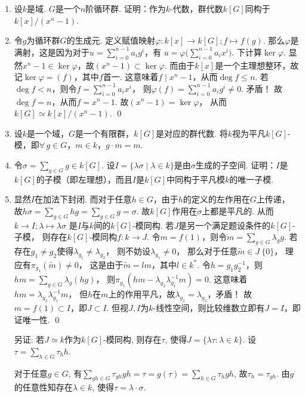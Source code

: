 \begin{enumerate}
\item[9.6] 设$k$是域. $G$是一个$n$阶循环群. 
    证明：作为$k$-代数，群代数$k[G]$同构于$k[x]/(x^{n}-1)$.
\item[\textbf{证明:}]
    令$g$为循环群$G$的生成元. 定义赋值映射$\varphi:k[x] \rightarrow k[G];f \mapsto f(g)$.
    那么$\varphi$是满射，这是因为对于$u=\sum\limits_{i=0}^{n-1}a_{i}g^{i}$，有
    $u = \varphi\big(\sum\limits_{i=0}^{n-1}a_{i}x^{i}\big)$.
    下计算$\ker \varphi$.
    显然$x^{n}-1 \in \ker \varphi$，故$(x^{n}-1) \subset \ker \varphi$.
    而由于$k[x]$是一个主理想整环，故记$\ker \varphi = (f)$，其中$f$首一.
    这意味着$f \mid x^{n}-1$，从而$\deg f \leq n$.
    若$\deg f < n$，则令$f = \sum\limits_{i=0}^{n-1}a_{i}x^{i}$，
    则$\varphi(f) = \sum\limits_{i=0}^{n-1}a_{i}g^{i} \neq 0$. 矛盾！
    故$\deg f = n$，从而$f = x^{n} - 1$.
    故$(x^{n}-1) = \ker \varphi$，
    从而$k[G] \simeq k[x]/(x^{n}-1)$. \qed

\item[9.7] 设$k$是一个域，$G$是一个有限群，$k[G]$是对应的群代数. 
    将$k$视为平凡$k[G]$-模，即$\forall \, g \in G$，$m \in k$，$g\cdot m=m$.
\item[(i)] 令$\sigma=\sum\limits_{g \in G}g \in k[G]$. 
    设$I = \{\lambda\sigma \mid \lambda \in k\}$是由$\sigma$生成的子空间.
    证明：$I$是$k[G]$的子模（即左理想），而且$I$是$k[G]$中同构于平凡模$k$的唯一子模.
\item[\textbf{证明:}]
    显然$I$在加法下封闭. 而对于任意$h \in G$，由于$h$的定义的左作用在$G$上传递，
    故$h\sigma=\sum\limits_{g \in G}hg = \sum\limits_{g \in G} g = \sigma$.
    故$k[G]$作用在$\sigma$上都是平凡的. 
    从而$k \rightarrow I;\lambda \mapsto \lambda\sigma$
    是$I$与$k$间的$k[G]$-模同构.
    若$J$是另一个满足题设条件的$k[G]$-子模，
    则存在$k[G]$-模同构$f:k \rightarrow J$.
    令$m=f(1)$，则令$m=\sum\limits_{g \in G}\lambda_{g}g$. 
    若存在$g_{1} \neq g_{2}$使得$\lambda_{g_{1}} \neq \lambda_{g_{2}}$，
    则不妨设$\lambda_{g_{1}} \neq 0$，
    那么对于任意$\widetilde{m} \in J \ \{0\}$，
    理应有$\pi_{g_{1}}(\widetilde{m}) \neq 0$，
    这是由于$\widetilde{m} = l m$，其中$l \in k^{*}$.
    令$h=g_{1}g_{2}^{-1}$，则$hm=\sum\limits_{g \in G}\lambda_{g}(hg)$，
    则$\pi_{g_{1}}(hm-\lambda_{g_{2}}\lambda_{g_{1}}^{-1}m) = 0$.
    这意味着$hm = \lambda_{g_{2}}\lambda_{g_{1}}^{-1}m$，
    但$h$在$m$上的作用平凡，故$\lambda_{g_{1}}=\lambda_{g_{2}}$，矛盾！
    故$m=f(1)\subset I$，即$J \subset I$.
    但视$J,I$为$k$-线性空间，则比较维数立即有$J=I$，即证唯一性. \qed 

    另证: 若$J\simeq k$作为$k[G]$-模同构, 
    则存在$\tau$, 使得$J=\{\lambda\tau:\lambda\in k\}$. 
    设$\tau=\sum\limits_{h\in G}\tau_h h$.\par
    对于任意$g\in G$, 有$\sum\limits_{gh\in G} \tau_{gh} gh
    =\tau=g(\tau)=\sum\limits_{h\in G} \tau_h gh$, 故$\tau_h=\tau_{gh}$. 
    由$g$的任意性知存在$\lambda\in k$, 使得$\tau=\lambda\cdot \sigma$.
            

\end{enumerate}
